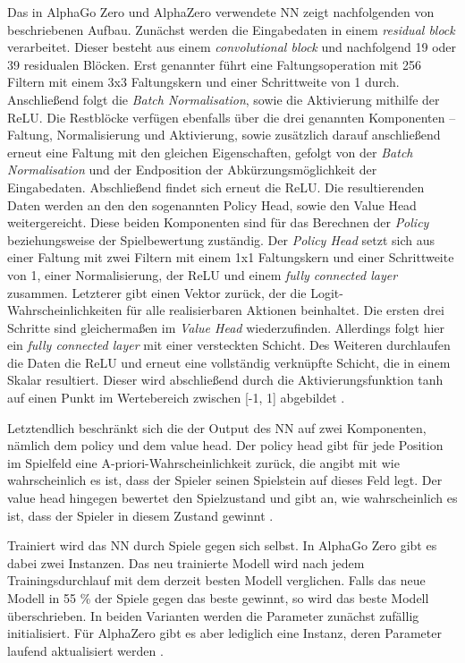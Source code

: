 \documentclass[12pt,a4paper]{article}
\begin{document}
Das in AlphaGo Zero und AlphaZero verwendete NN zeigt nachfolgenden von \cite{Silver2017} beschriebenen Aufbau.
Zunächst werden die Eingabedaten in einem \textit{residual block} verarbeitet. Dieser besteht aus einem \textit{convolutional block} und nachfolgend 19 oder 39 residualen Blöcken. Erst genannter führt eine Faltungsoperation mit 256 Filtern mit einem 3x3 Faltungskern und einer Schrittweite von 1 durch. Anschließend folgt die \textit{Batch Normalisation}, sowie die Aktivierung mithilfe der ReLU. Die Restblöcke verfügen ebenfalls über die drei genannten Komponenten – Faltung, Normalisierung und Aktivierung, sowie zusätzlich darauf anschließend erneut eine Faltung mit den gleichen Eigenschaften, gefolgt von der \textit{Batch Normalisation} und der Endposition der Abkürzungsmöglichkeit der Eingabedaten. Abschließend findet sich erneut die ReLU.
Die resultierenden Daten werden an den den sogenannten \glqq{}Policy Head\grqq{}, sowie den \glqq{}Value Head\grqq{} weitergereicht. Diese beiden Komponenten sind für das Berechnen der \textit{Policy} beziehungsweise der Spielbewertung zuständig. Der \textit{Policy Head} setzt sich aus einer Faltung mit zwei Filtern mit einem 1x1 Faltungskern und einer Schrittweite von 1, einer Normalisierung, der ReLU und einem \textit{fully connected layer} zusammen. Letzterer gibt einen Vektor zurück, der die Logit-Wahrscheinlichkeiten für alle realisierbaren Aktionen beinhaltet.
Die ersten drei Schritte sind gleichermaßen im \textit{Value Head} wiederzufinden. Allerdings folgt hier ein \textit{fully connected layer} mit einer versteckten Schicht. Des Weiteren durchlaufen die Daten die ReLU und erneut eine vollständig verknüpfte Schicht, die in einem Skalar resultiert. Dieser wird abschließend durch die Aktivierungsfunktion tanh auf einen Punkt im Wertebereich zwischen [-1, 1] abgebildet \cite{Silver2017}.

Letztendlich beschränkt sich die der Output des NN auf zwei Komponenten, nämlich dem policy und dem value head. Der policy head gibt für jede Position im Spielfeld eine A-priori-Wahrscheinlichkeit zurück, die angibt mit wie wahrscheinlich es ist, dass der Spieler seinen Spielstein auf dieses Feld legt. Der value head hingegen bewertet den Spielzustand und gibt an, wie wahrscheinlich es ist, dass der Spieler in diesem Zustand gewinnt \cite{Silver2017}.

Trainiert wird das NN durch Spiele gegen sich selbst. In AlphaGo Zero gibt es dabei zwei Instanzen. Das neu trainierte Modell wird nach jedem Trainingsdurchlauf mit dem derzeit besten Modell verglichen. Falls das neue Modell in 55 \% der Spiele gegen das beste gewinnt, so wird das beste Modell überschrieben. In beiden Varianten werden die Parameter zunächst zufällig initialisiert. Für AlphaZero gibt es aber lediglich eine Instanz, deren Parameter laufend aktualisiert werden \cite{SilverHubert2017}. 
\end{document}
